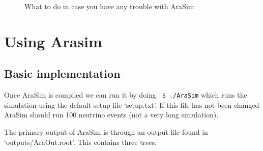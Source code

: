 \documentclass[a4paper,10pt]{article}
\newcommand{\room}{\vspace{0.3cm}}
\newcommand{\arasim}{AraSim\xspace}
\begin{document}
\begin{figure}[H]
\begin{centering}

  
  
 \end{centering}


 
 \caption{What to do in case you have any trouble with \arasim}
 
  \label{problems flowchart}
 
 \room
 
\end{figure}









\newpage

\section{Using Arasim}\label{running arasim}

\subsection{Basic implementation}\label{basic implementation}

Once \arasim is compiled we can run it by doing \verb| $ ./AraSim| which runs the simulation using the default setup file `setup.txt'. If this file has not been changed \arasim should run 100 neutrino events (not a very long simulation). 

The primary output of \arasim is through an output file found in `outputs/AraOut.root'. This contains three trees: 
\end{document}
